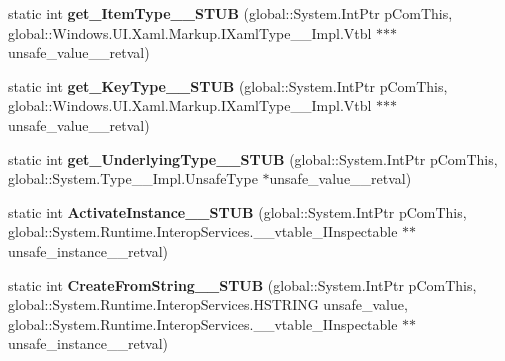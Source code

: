 \begin{DoxyCompactItemize}
static int {\bfseries get\+\_\+\+Item\+Type\+\_\+\+\_\+\+S\+T\+UB} (global\+::\+System.\+Int\+Ptr p\+Com\+This, global\+::\+Windows.\+U\+I.\+Xaml.\+Markup.\+I\+Xaml\+Type\+\_\+\+\_\+\+Impl.\+Vtbl $\ast$$\ast$$\ast$unsafe\+\_\+value\+\_\+\+\_\+retval)
\item 
\mbox{\label{struct_windows_1_1_u_i_1_1_xaml_1_1_markup_1_1_i_xaml_type_____impl_1_1_vtbl_a32bda91473ff4f18caa35169f3f20b45}} 
static int {\bfseries get\+\_\+\+Key\+Type\+\_\+\+\_\+\+S\+T\+UB} (global\+::\+System.\+Int\+Ptr p\+Com\+This, global\+::\+Windows.\+U\+I.\+Xaml.\+Markup.\+I\+Xaml\+Type\+\_\+\+\_\+\+Impl.\+Vtbl $\ast$$\ast$$\ast$unsafe\+\_\+value\+\_\+\+\_\+retval)
\item 
\mbox{\label{struct_windows_1_1_u_i_1_1_xaml_1_1_markup_1_1_i_xaml_type_____impl_1_1_vtbl_ae88b3159136111a5046e135fcbb3f0a9}} 
static int {\bfseries get\+\_\+\+Underlying\+Type\+\_\+\+\_\+\+S\+T\+UB} (global\+::\+System.\+Int\+Ptr p\+Com\+This, global\+::\+System.\+Type\+\_\+\+\_\+\+Impl.\+Unsafe\+Type $\ast$unsafe\+\_\+value\+\_\+\+\_\+retval)
\item 
\mbox{\label{struct_windows_1_1_u_i_1_1_xaml_1_1_markup_1_1_i_xaml_type_____impl_1_1_vtbl_a8cc9931ef9dd9b561fc2fd43c2373687}} 
static int {\bfseries Activate\+Instance\+\_\+\+\_\+\+S\+T\+UB} (global\+::\+System.\+Int\+Ptr p\+Com\+This, global\+::\+System.\+Runtime.\+Interop\+Services.\+\_\+\+\_\+vtable\+\_\+\+I\+Inspectable $\ast$$\ast$unsafe\+\_\+instance\+\_\+\+\_\+retval)
\item 
\mbox{\label{struct_windows_1_1_u_i_1_1_xaml_1_1_markup_1_1_i_xaml_type_____impl_1_1_vtbl_a4ec1b4609a6a59d45cf0d088e334b47f}} 
static int {\bfseries Create\+From\+String\+\_\+\+\_\+\+S\+T\+UB} (global\+::\+System.\+Int\+Ptr p\+Com\+This, global\+::\+System.\+Runtime.\+Interop\+Services.\+H\+S\+T\+R\+I\+NG unsafe\+\_\+value, global\+::\+System.\+Runtime.\+Interop\+Services.\+\_\+\+\_\+vtable\+\_\+\+I\+Inspectable $\ast$$\ast$unsafe\+\_\+instance\+\_\+\+\_\+retval)
\item 
\mbox{\label{struct_windows_1_1_u_i_1_1_xaml_1_1_markup_1_1_i_xaml_type_____impl_1_1_vtbl_a57b2a1b073d141eddd531ec9acd7d9ea}} 

\end{DoxyCompactItemize}
